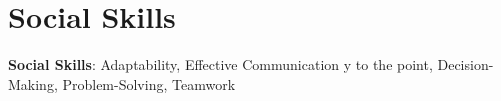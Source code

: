 \documentclass[letterpaper,11pt]{article}
\begin{document}
\section{Social Skills}
\begin{itemize}[leftmargin=0.15in, label={}]
	\small{\item{
                        \textbf{Social Skills}{: Adaptability, Effective Communication y to the point, Decision-Making, Problem-Solving, Teamwork} \\
		      }}
\end{itemize}
\end{document}

